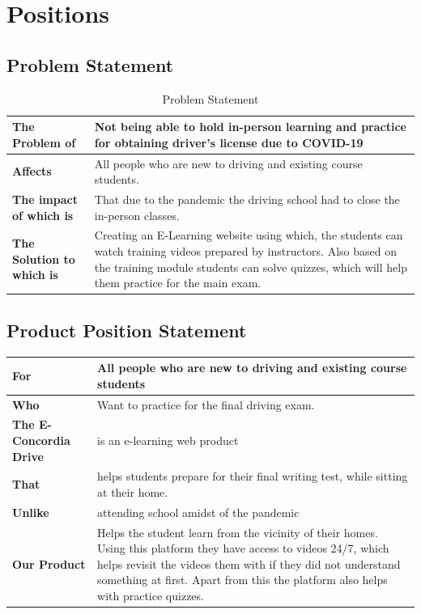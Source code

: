 \documentclass{article}
\begin{document}
\section{Positions}

\subsection{Problem Statement}

\begin{table}[h!]
\begin{tabular}{|p{4.5cm}|p{11.5cm}|}
\hline
\textbf{The Problem of} & Not being able to hold in-person learning and practice for obtaining driver's license due to COVID-19 \\ \hline
\textbf{Affects} & All people who are new to driving and existing course students. \\ \hline
\textbf{The impact of which is} & That due to the pandemic the driving school had to close the in-person classes. \\ \hline
\textbf{The Solution to which is} & Creating an E-Learning website using which, the students can watch training videos prepared by instructors. Also based on the training module students can solve quizzes, which will help them practice for the main exam.\\ \hline
\end{tabular}
\caption{Problem Statement}
\label{table:1}
\end{table}

\subsection{Product Position Statement}


\begin{tabular}{|p{4.5cm}|p{11.5cm}|}
\hline
\textbf{For} & All people who are new to driving and existing course students\\ \hline
\textbf{Who}& Want to practice for the final driving exam.\\ \hline
\textbf{The E-Concordia Drive} & is an e-learning web product\\ \hline
\textbf{That} & helps students prepare for their final writing test, while sitting at their home.\\ \hline
\textbf{Unlike} & attending school amidst of the pandemic \\ \hline
\textbf{Our Product} & Helps the student learn from the vicinity of their homes. Using this platform they have access to videos 24/7, which helps revisit the videos them with if they did not understand something at first. Apart from this the platform also helps with practice quizzes.\\ \hline
\end{tabular}
\end{document}
